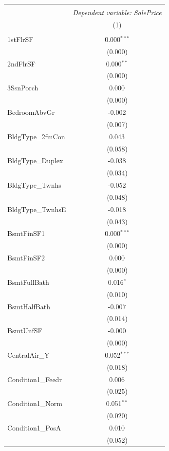 \begin{table}[!htbp] \centering
\begin{tabular}{@{\extracolsep{5pt}}lc}
\\[-1.8ex]\hline
\hline \\[-1.8ex]
& \multicolumn{1}{c}{\textit{Dependent variable: SalePrice}} \
\cr \cline{2-2}
\\[-1.8ex] & (1) \\
\hline \\[-1.8ex]
 1stFlrSF & 0.000$^{***}$ \\
& (0.000) \\
 2ndFlrSF & 0.000$^{**}$ \\
& (0.000) \\
 3SsnPorch & 0.000$^{}$ \\
& (0.000) \\
 BedroomAbvGr & -0.002$^{}$ \\
& (0.007) \\
 BldgType_2fmCon & 0.043$^{}$ \\
& (0.058) \\
 BldgType_Duplex & -0.038$^{}$ \\
& (0.034) \\
 BldgType_Twnhs & -0.052$^{}$ \\
& (0.048) \\
 BldgType_TwnhsE & -0.018$^{}$ \\
& (0.043) \\
 BsmtFinSF1 & 0.000$^{***}$ \\
& (0.000) \\
 BsmtFinSF2 & 0.000$^{}$ \\
& (0.000) \\
 BsmtFullBath & 0.016$^{*}$ \\
& (0.010) \\
 BsmtHalfBath & -0.007$^{}$ \\
& (0.014) \\
 BsmtUnfSF & -0.000$^{}$ \\
& (0.000) \\
 CentralAir_Y & 0.052$^{***}$ \\
& (0.018) \\
 Condition1_Feedr & 0.006$^{}$ \\
& (0.025) \\
 Condition1_Norm & 0.051$^{**}$ \\
& (0.020) \\
 Condition1_PosA & 0.010$^{}$ \\
& (0.052) \\

\end{tabular}
\end{table}
